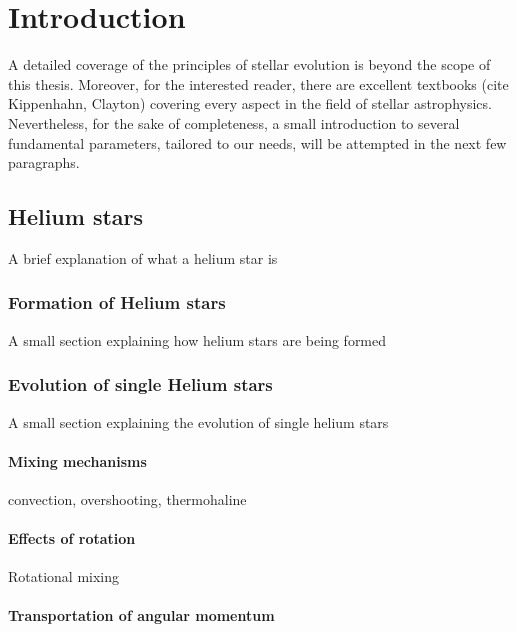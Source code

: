 \documentclass[../../main/thesis_msc.tex]{subfiles}
\begin{document}
    \chapter{Introduction}
    
		A detailed coverage of the principles of stellar evolution is beyond the scope of this thesis. Moreover, for the interested reader, there are excellent textbooks (cite Kippenhahn, Clayton) covering every aspect in the field of stellar astrophysics. Nevertheless, for the sake of completeness, a small introduction to several fundamental parameters, tailored to our needs, will be attempted in the next few paragraphs. 
		
    
    
    \section{Helium stars}
    	
    	A brief explanation of what a helium star is


			\subsection{Formation of Helium stars}
			
				A small section explaining how helium stars are being formed
				
			
			\subsection{Evolution of single Helium stars}
			
				A small section explaining the evolution of single helium stars    	
				
					\subsubsection{Mixing mechanisms}
					
						convection, overshooting, thermohaline
						
					\subsubsection{Effects of rotation}
					
						Rotational mixing 
						
					\subsubsection{Transportation of angular momentum}
					
\end{document}
